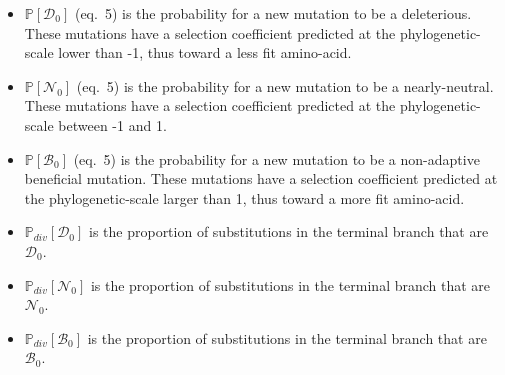 \documentclass{article}
\newcommand{\proba}{\mathbb{P}}
\newcommand{\SphyDel}{\mathcal{D}_0}
\newcommand{\SphyNeu}{\mathcal{N}_0}
\newcommand{\SphyBen}{\mathcal{B}_0}
\begin{document}
    \begin{itemize}
        \item $\proba [ \SphyDel ]$ (eq.~5) is the probability for a new mutation to be a deleterious.
        These mutations have a selection coefficient predicted at the phylogenetic-scale lower than -1, thus toward a less fit amino-acid.
        \item $\proba [ \SphyNeu ]$ (eq.~5) is the probability for a new mutation to be a nearly-neutral.
        These mutations have a selection coefficient predicted at the phylogenetic-scale between -1 and 1.
        \item $\proba [ \SphyBen ]$ (eq.~5) is the probability for a new mutation to be a  non-adaptive beneficial mutation.
        These mutations have a selection coefficient predicted at the phylogenetic-scale larger than 1, thus toward a more fit amino-acid.
        \item $\proba_{div}[\SphyDel]$ is the proportion of substitutions in the terminal branch that are $\SphyDel$.
        \item $\proba_{div}[\SphyNeu]$ is the proportion of substitutions in the terminal branch that are $\SphyNeu$.
        \item $\proba_{div}[\SphyBen]$ is the proportion of substitutions in the terminal branch that are $\SphyBen$.
    \end{itemize}
    \newpage
\end{document}

